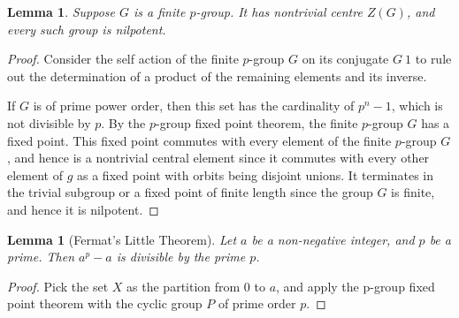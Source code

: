 \documentclass[10pt,twocolumn]{article}
\newtheorem{lemma}[theorem]{Lemma}
\begin{document}
\begin{lemma}
    Suppose $G$ is a finite $p$-group. It has nontrivial centre $Z(G)$, and every such group is nilpotent.
\end{lemma}

\begin{proof}
    Consider the self action of the finite $p$-group $G$ on its conjugate $G \ {1}$ to rule out the determination of a product of the remaining elements and its inverse.

    If $G$ is of prime power order, then this set has the cardinality of $p^n - 1$, which is not divisible by $p$. By the $p$-group fixed point theorem, the finite $p$-group $G$ has a fixed point. This fixed point commutes with every element of the finite $p$-group $G$, and hence is a nontrivial central element since it commutes with every other element of $g$ as a fixed point with orbits being disjoint unions. It terminates in the trivial subgroup or a fixed point of finite length since the group $G$ is finite, and hence it is nilpotent.
\end{proof}

\begin{lemma}[Fermat's Little Theorem]
    Let $a$ be a non-negative integer, and $p$ be a prime.
    Then $a^p - a$ is divisible by the prime $p$. 
\end{lemma}

\begin{proof}
    Pick the set $X$ as the partition from $0$ to $a$, and apply the p-group fixed point theorem with the cyclic group $P$ of prime order $p$.
\end{proof}



\end{document}

